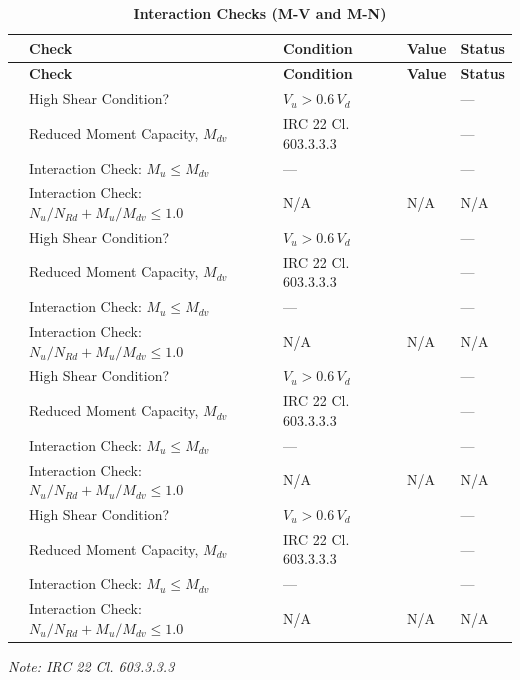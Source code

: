 \documentclass[12pt,a4paper]{report}
\numberwithin{table}{chapter}
\numberwithin{figure}{chapter}
\newcommand{\reportrowpad}{4pt}
\newcommand{\reportsectiongap}{0.75em}
\begin{document}
\vspace{\reportsectiongap}
\begin{longtable}{|C{2.5cm}|C{3.5cm}|C{3.5cm}|>{\centering\arraybackslash}p{4.2cm}|C{1.8cm}|}
\caption{\textbf{Interaction Checks (M-V and M-N)}}\\
\hline
\textbf{} & \textbf{Check} & \textbf{Condition} & \textbf{Value} & \textbf{Status} \\[\reportrowpad]
\hline
\endfirsthead
\hline
\textbf{} & \textbf{Check} & \textbf{Condition} & \textbf{Value} & \textbf{Status} \\[\reportrowpad]
\hline
\endhead
{} & High Shear Condition? & $V_u > 0.6\,V_d$ &  & --- \\[\reportrowpad]
 & Reduced Moment Capacity, $M_{dv}$ & IRC 22 Cl. 603.3.3.3 &  & --- \\[\reportrowpad]
 & Interaction Check: $M_u \leq M_{dv}$ & --- &  & --- \\[\reportrowpad]
 & Interaction Check: $N_u/N_{Rd} + M_u/M_{dv} \leq 1.0$ & N/A & N/A & N/A \\[\reportrowpad]
\hline
{} & High Shear Condition? & $V_u > 0.6\,V_d$ &  & --- \\[\reportrowpad]
 & Reduced Moment Capacity, $M_{dv}$ & IRC 22 Cl. 603.3.3.3 &  & --- \\[\reportrowpad]
 & Interaction Check: $M_u \leq M_{dv}$ & --- &  & --- \\[\reportrowpad]
 & Interaction Check: $N_u/N_{Rd} + M_u/M_{dv} \leq 1.0$ & N/A & N/A & N/A \\[\reportrowpad]
\hline
{} & High Shear Condition? & $V_u > 0.6\,V_d$ &  & --- \\[\reportrowpad]
 & Reduced Moment Capacity, $M_{dv}$ & IRC 22 Cl. 603.3.3.3 &  & --- \\[\reportrowpad]
 & Interaction Check: $M_u \leq M_{dv}$ & --- &  & --- \\[\reportrowpad]
 & Interaction Check: $N_u/N_{Rd} + M_u/M_{dv} \leq 1.0$ & N/A & N/A & N/A \\[\reportrowpad]
\hline
{} & High Shear Condition? & $V_u > 0.6\,V_d$ &  & --- \\[\reportrowpad]
 & Reduced Moment Capacity, $M_{dv}$ & IRC 22 Cl. 603.3.3.3 &  & --- \\[\reportrowpad]
 & Interaction Check: $M_u \leq M_{dv}$ & --- &  & --- \\[\reportrowpad]
 & Interaction Check: $N_u/N_{Rd} + M_u/M_{dv} \leq 1.0$ & N/A & N/A & N/A \\[\reportrowpad]
\hline
\end{longtable}
\noindent\textit{Note: IRC 22 Cl. 603.3.3.3}
\end{document}
